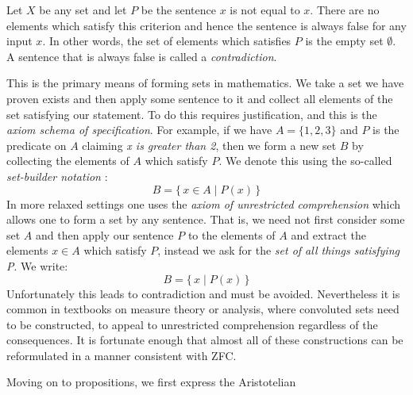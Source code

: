         \begin{example}
            Let $X$ be any set and let $P$ be the sentence $x$ is not equal to
            $x$. There are no elements which satisfy this criterion and hence
            the sentence is always false for any input $x$. In other words, the
            set of elements which satisfies $P$ is the empty set $\emptyset$.
            A sentence that is always false is called a
            \textit{contradiction}.
        \end{example}
        This is the primary means of forming sets in mathematics. We take a set
        we have proven exists and then apply some sentence to it and collect all
        elements of the set satisfying our statement. To do this requires
        justification, and this is the \textit{axiom schema of specification}.
        For example, if we have $A=\{1,2,3\}$ and $P$ is the predicate on $A$
        claiming \textit{x is greater than 2}, then we form a new set $B$ by
        collecting the elements of $A$ which satisfy $P$. We denote this using
        the so-called \textit{set-builder notation}%
        :
        \begin{equation}
            B=\{\,x\in{A}\;|\;P(x)\,\}
        \end{equation}
        In more relaxed settings one uses the \textit{axiom of unrestricted}
        \textit{comprehension} which
        allows one to form a set by any sentence. That is, we need not first
        consider some set $A$ and then apply our sentence $P$ to the elements of
        $A$ and extract the elements $x\in{A}$ which satisfy $P$, instead we
        ask for the \textit{set of all things satisfying P}. We write:
        \begin{equation}
            B=\{\,x\;|\;P(x)\,\}
        \end{equation}
        Unfortunately this leads to contradiction and must be avoided.
        Nevertheless it is common in textbooks on measure theory or analysis,
        where convoluted sets need to be constructed, to appeal to unrestricted
        comprehension regardless of the consequences. It is fortunate enough
        that almost all of these constructions can be reformulated in a manner
        consistent with \gls{ZFC}.
        \par\hfill\par
        Moving on to propositions, we first express the Aristotelian
